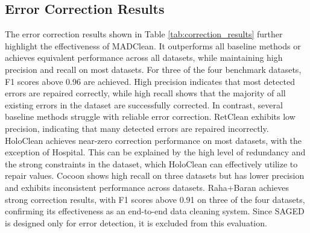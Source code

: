 \subsection{Error Correction Results}
The error correction results shown in Table \ref{tab:correction_results} further highlight the effectiveness of MADClean. 
It outperforms all baseline methods or achieves equivalent performance across all datasets, while maintaining high precision and recall on most datasets. 
For three of the four benchmark datasets, F1 scores above 0.96 are achieved. 
High precision indicates that most detected errors are repaired correctly, while high recall shows that the majority of all existing errors in the dataset are successfully corrected.
\newline\newline
In contrast, several baseline methods struggle with reliable error correction. 
RetClean exhibits low precision, indicating that many detected errors are repaired incorrectly. 
HoloClean achieves near-zero correction performance on most datasets, with the exception of Hospital. 
This can be explained by the high level of redundancy and the strong constraints in the dataset, which HoloClean can effectively utilize to repair values. 
Cocoon shows high recall on three datasets but has lower precision and exhibits inconsistent performance across datasets. 
Raha+Baran achieves strong correction results, with F1 scores above 0.91 on three of the four datasets, confirming its effectiveness as an end-to-end data cleaning system. 
Since SAGED is designed only for error detection, it is excluded from this evaluation.

